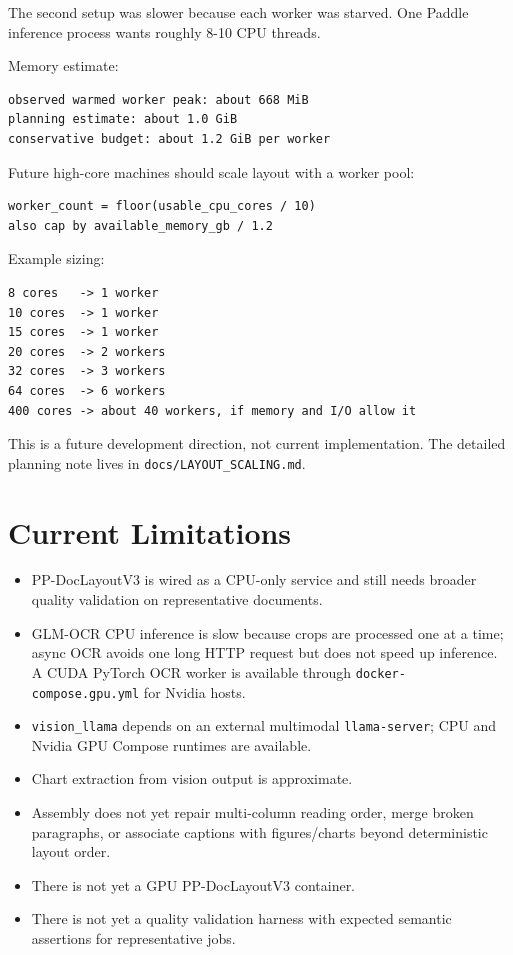 \documentclass[11pt,a4paper]{article}
\begin{document}
The second setup was slower because each worker was starved. One Paddle
inference process wants roughly 8-10 CPU threads.

Memory estimate:

\begin{lstlisting}
observed warmed worker peak: about 668 MiB
planning estimate: about 1.0 GiB
conservative budget: about 1.2 GiB per worker
\end{lstlisting}

Future high-core machines should scale layout with a worker pool:

\begin{lstlisting}
worker_count = floor(usable_cpu_cores / 10)
also cap by available_memory_gb / 1.2
\end{lstlisting}

Example sizing:

\begin{lstlisting}
8 cores   -> 1 worker
10 cores  -> 1 worker
15 cores  -> 1 worker
20 cores  -> 2 workers
32 cores  -> 3 workers
64 cores  -> 6 workers
400 cores -> about 40 workers, if memory and I/O allow it
\end{lstlisting}

This is a future development direction, not current implementation. The
detailed planning note lives in \texttt{docs/LAYOUT\_SCALING.md}.

\section{Current Limitations}

\begin{itemize}[leftmargin=1.2cm]
\item PP-DocLayoutV3 is wired as a CPU-only service and still needs broader
  quality validation on representative documents.
\item GLM-OCR CPU inference is slow because crops are processed one at a time;
  async OCR avoids one long HTTP request but does not speed up inference. A
  CUDA PyTorch OCR worker is available through \texttt{docker-compose.gpu.yml}
  for Nvidia hosts.
\item \texttt{vision\_llama} depends on an external multimodal
  \texttt{llama-server}; CPU and Nvidia GPU Compose runtimes are available.
\item Chart extraction from vision output is approximate.
\item Assembly does not yet repair multi-column reading order, merge broken
  paragraphs, or associate captions with figures/charts beyond deterministic
  layout order.
\item There is not yet a GPU PP-DocLayoutV3 container.
\item There is not yet a quality validation harness with expected semantic
  assertions for representative jobs.
\end{itemize}
\end{document}
